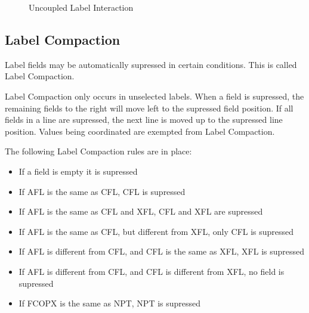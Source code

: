 \documentclass[a4paper,oneside,11pt]{memoir}
\begin{document}
\begin{figure}[H]
\centering
{}
\caption{Uncoupled Label Interaction}
\end{figure}


\subsection{Label Compaction}
\label{tlabel:comp}

Label fields may be automatically supressed in certain conditions. This is called Label Compaction.

Label Compaction only occurs in unselected labels. When a field is supressed, the remaining fields to the right will move left to the supressed field position. If all fields in a line are supressed, the next line is moved up to the supressed line position. Values being coordinated are exempted from Label Compaction.

\bigskip

The following Label Compaction rules are in place:

\begin{itemize}
  \item If a field is empty it is supressed
  \item If AFL is the same as CFL, CFL is supressed
  \item If AFL is the same as CFL and XFL, CFL and XFL are supressed
  \item If AFL is the same as CFL, but different from XFL, only CFL is supressed
  \item If AFL is different from CFL, and CFL is the same as XFL, XFL is supressed
  \item If AFL is different from CFL, and CFL is different from XFL, no field is supressed
  \item If FCOPX is the same as NPT, NPT is supressed
\end{itemize}
\end{document}
